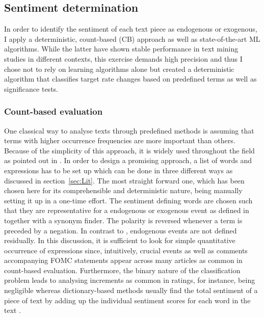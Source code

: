 %
\subsection{Sentiment determination}

In order to identify the sentiment of each text piece as endogenous or exogenous, I apply a deterministic, count-based (CB) approach as well as state-of-the-art ML algorithms. While the latter have shown stable performance in text mining studies in different contexts, this exercise demands high precision and thus I chose not to rely on learning algorithms alone but created a deterministic algorithm that classifies target rate changes based on predefined terms as well as significance tests. 

%
\subsubsection{Count-based evaluation}

One classical way to analyse texts through predefined methods is assuming that terms with higher occurrence frequencies are more important than others. Because of the simplicity of this approach, it is widely used throughout the field as pointed out in \textcite{Meyer2008}. In order to design a promising approach, a list of words and expressions has to be set up which can be done in three different ways as discussed in section~\ref{sec:Lit}. The most straight forward one, which has been chosen here for its comprehensible and deterministic nature, being manually setting it up in a one-time effort. The sentiment defining words are chosen such that they are representative for a endogenous or exogenous event as defined in \textcite{Ellingsen.2003} together with a synonym finder. The polarity is reversed whenever a term is preceded by a negation. In contrast to \textcite{Ellingsen.2003}, endogenous events are not defined residually.
In this discussion, it is sufficient to look for simple quantitative occurrence of expressions since, intuitively, crucial events as well as comments accompanying FOMC statements appear across many articles as common in count-based evaluation. Furthermore, the binary nature of the classification problem leads to analysing increments as common in ratings, for instance, being negligible whereas dictionary-based methods usually find the total sentiment of a piece of text by adding up the individual sentiment scores for each word in the text \parencite{Silge.2017}. 

